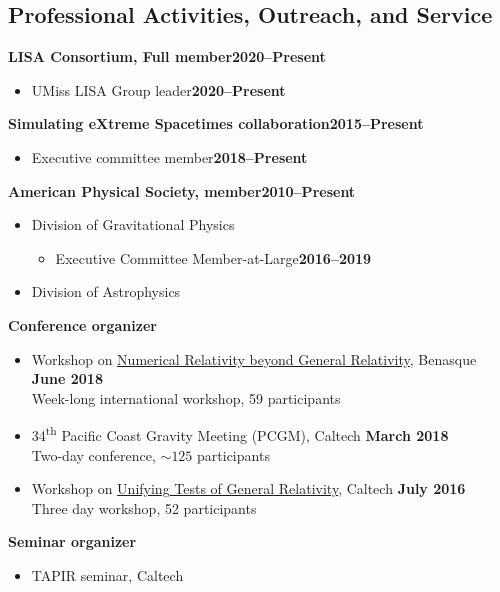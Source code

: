 \documentclass[margin,line]{res}
\begin{document}
\begin{resume}
\section{\sc Professional Activities, Outreach, and Service}
{\bf LISA Consortium, Full member}\hfill{\bf 2020--Present}
\begin{itemize}
\item[] UMiss LISA Group leader\hfill{\bf 2020--Present}
\end{itemize}
{\bf Simulating eXtreme Spacetimes collaboration}\hfill{\bf 2015--Present}
\begin{itemize}
\item[] Executive committee member\hfill{\bf 2018--Present}
\end{itemize}
{\bf American Physical Society, member}\hfill{\bf 2010--Present}
\begin{itemize}
\item[] Division of Gravitational Physics
  \begin{itemize}
  \item[] Executive Committee Member-at-Large\hfill{\bf 2016--2019}
  \end{itemize}
\item[] Division of Astrophysics
\end{itemize}
{\bf Conference organizer}
\vspace*{.05in}
\begin{itemize}
\item[] Workshop on
  \href{http://www.benasque.org/2018relativity/}{Numerical Relativity
    beyond General Relativity},
  Benasque \hfill {\bf June 2018} \\
\hspace*{1em} Week-long international workshop, 59 participants
\item[]
34\textsuperscript{th} Pacific Coast Gravity Meeting (PCGM),
Caltech
\hfill {\bf March 2018}\\
\hspace*{1em} Two-day conference, $\sim 125$ participants
\item[] Workshop on \href{http://www.tapir.caltech.edu/~unifying-gr-tests/}{Unifying Tests of General Relativity},
  Caltech \hfill {\bf July 2016} \\
\hspace*{1em} Three day workshop, 52 participants
\end{itemize}
{\bf Seminar organizer}
\vspace*{.05in}
\begin{itemize}
\item[] TAPIR seminar, Caltech\hfill

\end{itemize}
\end{resume}
\end{document}
